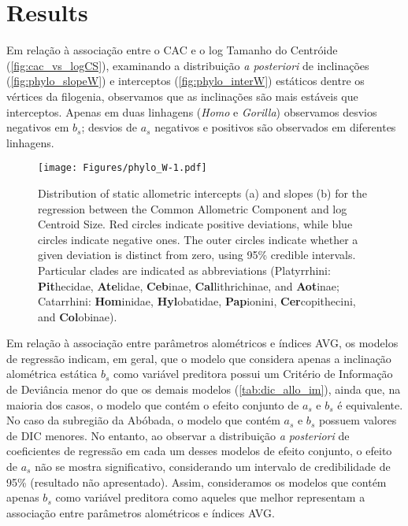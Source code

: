 \documentclass[12pt,]{article}
\begin{document}
\section{Results}\label{results}



Em relação à associação entre o CAC e o log Tamanho do Centróide
(\autoref{fig:cac_vs_logCS}), examinando a distribuição \emph{a
posteriori} de inclinações (\autoref{fig:phylo_slopeW}) e interceptos
(\autoref{fig:phylo_interW}) estáticos dentre os vértices da filogenia,
observamos que as inclinações são mais estáveis que interceptos. Apenas
em duas linhagens (\emph{Homo} e \emph{Gorilla}) observamos desvios
negativos em $b_s$; desvios de $a_s$ negativos e positivos são
observados em diferentes linhagens.

\begin{figure}[htbp]
\centering
\texttt{[image: Figures/phylo\_W-1.pdf]}
\caption{Distribution of static allometric intercepts (a) and slopes (b)
for the regression between the Common Allometric Component and log
Centroid Size. Red circles indicate positive deviations, while blue
circles indicate negative ones. The outer circles indicate whether a
given deviation is distinct from zero, using 95\% credible intervals.
Particular clades are indicated as abbreviations (Platyrrhini:
\textbf{Pit}hecidae, \textbf{Ate}lidae, \textbf{Ceb}inae,
\textbf{Cal}lithrichinae, and \textbf{Aot}inae; Catarrhini:
\textbf{Hom}inidae, \textbf{Hyl}obatidae, \textbf{Pap}ionini,
\textbf{Cer}copithecini, and \textbf{Col}obinae). \label{fig:phylo_W}}
\end{figure}

Em relação à associação entre parâmetros alométricos e índices AVG, os
modelos de regressão indicam, em geral, que o modelo que considera
apenas a inclinação alométrica estática $b_s$ como variável preditora
possui um Critério de Informação de Deviância menor do que os demais
modelos (\autoref{tab:dic_allo_im}), ainda que, na maioria dos casos, o
modelo que contém o efeito conjunto de $a_s$ e $b_s$ é equivalente. No
caso da subregião da Abóbada, o modelo que contém $a_s$ e $b_s$ possuem
valores de DIC menores. No entanto, ao observar a distribuição \emph{a
posteriori} de coeficientes de regressão em cada um desses modelos de
efeito conjunto, o efeito de $a_s$ não se mostra significativo,
considerando um intervalo de credibilidade de 95\% (resultado não
apresentado). Assim, consideramos os modelos que contém apenas $b_s$
como variável preditora como aqueles que melhor representam a associação
entre parâmetros alométricos e índices AVG.
\end{document}
